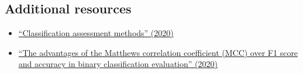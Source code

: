 \documentclass[letterpaper, 12pt]{article}
\begin{document}

\subsection*{Additional resources}

\begin{itemize}
    \setlength\itemsep{-0.5em}
    \item \href{https://doi.org/10.1016/j.aci.2018.08.003}{``Classification assessment methods'' (2020)}
    \item \href{https://doi.org/10.1186/s12864-019-6413-7}{``The advantages of the Matthews correlation coefficient (MCC) over F1 score and accuracy in binary classification evaluation'' (2020)}
\end{itemize}
\end{document}
